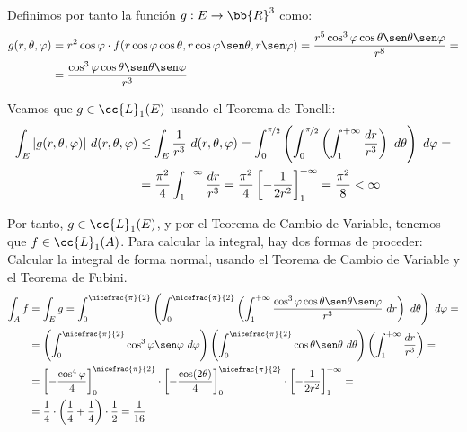 \begin{ejercicio}
\begin{enumerate}
        Definimos por tanto la función $g: E \to \bb{R}^3$ como:
        \begin{align*}
            g(r, \theta, \varphi) &= r^2\cos\varphi\cdot f(r\cos\varphi\cos\theta, r\cos\varphi\sen\theta, r\sen\varphi)
            = \frac{r^5\cos^3\varphi\cos\theta\sen\theta\sen\varphi}{r^8} =\\
            &= \frac{\cos^3\varphi\cos\theta\sen\theta\sen\varphi}{r^3}
        \end{align*}

        Veamos que $g\in \cc{L}_1(E)$ usando el Teorema de Tonelli:
        \begin{align*}
            \int_E |g(r, \theta, \varphi)|~d(r, \theta, \varphi)
            &\leq \int_E \frac{1}{r^3}~d(r, \theta, \varphi)
            = \int_{0}^{\nicefrac{\pi}{2}} \left( \int_{0}^{\nicefrac{\pi}{2}} \left( \int_1^{+\infty} \frac{dr}{r^3} \right)~d\theta \right)~d\varphi
            =\\&= \frac{\pi^2}{4} \int_{1}^{+\infty} \frac{dr}{r^3}
            = \frac{\pi^2}{4} \left[ -\frac{1}{2r^2} \right]_1^{+\infty} = \frac{\pi^2}{8} < \infty
        \end{align*}

        Por tanto, $g\in \cc{L}_1(E)$, y por el Teorema de Cambio de Variable, tenemos que $f\in \cc{L}_1(A)$. Para calcular la integral, hay dos formas de proceder:
        Calcular la integral de forma normal, usando el Teorema de Cambio de Variable y el Teorema de Fubini.
        \begin{align*}
            \int_A f &= \int_E g = \int_{0}^{\nicefrac{\pi}{2}} \left( \int_{0}^{\nicefrac{\pi}{2}} \left( \int_1^{+\infty} \frac{\cos^3\varphi\cos\theta\sen\theta\sen\varphi}{r^3}~dr \right)~d\theta \right)~d\varphi =\\
            &= \left( \int_{0}^{\nicefrac{\pi}{2}} \cos^3\varphi\sen\varphi~d\varphi \right) \left( \int_{0}^{\nicefrac{\pi}{2}} \cos\theta\sen\theta~d\theta \right) \left( \int_1^{+\infty} \frac{dr}{r^3} \right) =\\
            &= \left[-\dfrac{\cos^4\varphi}{4}\right]_{0}^{\nicefrac{\pi}{2}} \cdot \left[-\dfrac{\cos(2\theta)}{4}\right]_{0}^{\nicefrac{\pi}{2}} \cdot \left[-\dfrac{1}{2r^2}\right]_1^{+\infty} =\\
            &= \frac{1}{4} \cdot \left(\frac{1}{4}+\frac{1}{4}\right) \cdot \dfrac{1}{2} = \frac{1}{16}
        \end{align*}

        \begin{comment}


\end{comment}
\end{enumerate}
\end{ejercicio}
